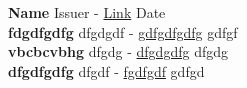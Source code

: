 \documentclass[9pt]{developercv} %
\begin{document}
    
    

    
    
        \vspace{-10 pt}
        \vspace{-6pt} 
        
          \hspace{26mm} 
          \textbf{Name} Issuer - \href{Link}{Link} \hfill Date \\
        
          \hspace{26mm} 
          \textbf{fdgdfgdfg} dfgdgdf - \href{gdfgdfgdfg}{gdfgdfgdfg} \hfill gdfgf \\
        
          \hspace{26mm} 
          \textbf{vbcbcvbhg} dfgdg - \href{dfgdgdfg}{dfgdgdfg} \hfill dfgdg \\
        
          \hspace{26mm} 
          \textbf{dfgdfgdfg} dfgdf - \href{fgdfgdf}{fgdfgdf} \hfill gdfgd \\
        
        
    
    
\end{document}
